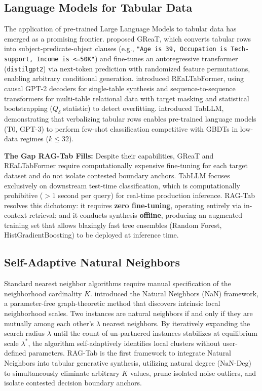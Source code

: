 \documentclass[sn-basic]{sn-jnl}
\begin{document}
\subsection{Language Models for Tabular Data}
The application of pre-trained Large Language Models to tabular data has emerged as a promising frontier. \citet{borisov2023language} proposed GReaT, which converts tabular rows into subject-predicate-object clauses (e.g., \texttt{"Age is 39, Occupation is Tech-support, Income is <=50K"}) and fine-tunes an autoregressive transformer (\texttt{distilgpt2}) via next-token prediction with randomized feature permutations, enabling arbitrary conditional generation. \citet{solatorio2023realtabformer} introduced REaLTabFormer, using causal GPT-2 decoders for single-table synthesis and sequence-to-sequence transformers for multi-table relational data with target masking and statistical bootstrapping ($Q_\delta$ statistic) to detect overfitting. \citet{hegselmann2023tabllm} introduced TabLLM, demonstrating that verbalizing tabular rows enables pre-trained language models (T0, GPT-3) to perform few-shot classification competitive with GBDTs in low-data regimes ($k \le 32$).

\textbf{The Gap RAG-Tab Fills:} Despite their capabilities, GReaT and REaLTabFormer require computationally expensive fine-tuning for each target dataset and do not isolate contested boundary anchors. TabLLM focuses exclusively on downstream test-time classification, which is computationally prohibitive ($>1$ second per query) for real-time production inference. RAG-Tab resolves this dichotomy: it requires \textbf{zero fine-tuning}, operating entirely via in-context retrieval; and it conducts synthesis \textbf{offline}, producing an augmented training set that allows blazingly fast tree ensembles (Random Forest, HistGradientBoosting) to be deployed at inference time.

\subsection{Self-Adaptive Natural Neighbors}
Standard nearest neighbor algorithms require manual specification of the neighborhood cardinality $K$. \citet{huang2011natural} introduced the Natural Neighbors (NaN) framework, a parameter-free graph-theoretic method that discovers intrinsic local neighborhood scales. Two instances are natural neighbors if and only if they are mutually among each other's $\lambda$ nearest neighbors. By iteratively expanding the search radius $\lambda$ until the count of un-partnered instances stabilizes at equilibrium scale $\lambda^*$, the algorithm self-adaptively identifies local clusters without user-defined parameters. RAG-Tab is the first framework to integrate Natural Neighbors into tabular generative synthesis, utilizing natural degree ($\text{NaN-Deg}$) to simultaneously eliminate arbitrary $K$ values, prune isolated noise outliers, and isolate contested decision boundary anchors.
\end{document}
